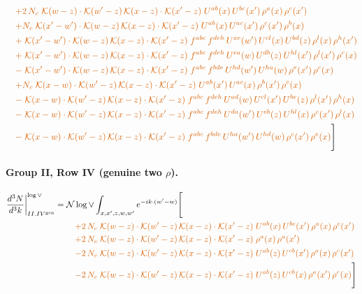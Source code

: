 \documentclass[10pt]{article}
\numberwithin{equation}{section}
\newcommand{\NNv}{\mathcal N\log\vee}
\begin{document}
\begin{align}
&\quad{\color{BFK}+2\,N_c\;\mathcal{K}(w-z)\cdot\mathcal{K}(w'-z)\,\mathcal{K}(x-z)\cdot\mathcal{K}(x'-z)\;U^{ab}(x)\,U^{bc}(x')\,\rho^{a}(x)\,\rho^{c}(x')}\notag\\
&\quad{\color{BFK}+N_c\;\mathcal{K}(x'-w')\cdot\mathcal{K}(w-z)\,\mathcal{K}(x-z)\cdot\mathcal{K}(x'-z)\;U^{ab}(x)\,U^{ac}(x')\,\rho^{c}(x')\,\rho^{b}(x)}\notag\\
&\quad{\color{BFK}+\;\mathcal{K}(x'-w')\cdot\mathcal{K}(w-z)\,\mathcal{K}(x-z)\cdot\mathcal{K}(x'-z)\;f^{abc}\,f^{deh}\,U^{ae}(w')\,U^{cl}(x)\,U^{bd}(z)\,\rho^{l}(x)\,\rho^{h}(x')}\notag\\
&\quad{\color{BFK}+\;\mathcal{K}(x'-w')\cdot\mathcal{K}(w-z)\,\mathcal{K}(x-z)\cdot\mathcal{K}(x'-z)\;f^{abc}\,f^{deh}\,U^{ea}(w)\,U^{db}(z)\,U^{hl}(x')\,\rho^{l}(x')\,\rho^{c}(x)}\notag\\
&\quad{\color{BFK}-\;\mathcal{K}(x'-w')\cdot\mathcal{K}(w-z)\,\mathcal{K}(x-z)\cdot\mathcal{K}(x'-z)\;f^{abc}\,f^{bde}\,U^{hd}(w')\,U^{ha}(w)\,\rho^{e}(x')\,\rho^{c}(x)}\notag\\
&\quad{\color{BFK}+N_c\;\mathcal{K}(x-w)\cdot\mathcal{K}(w'-z)\,\mathcal{K}(x-z)\cdot\mathcal{K}(x'-z)\;U^{ab}(x')\,U^{ac}(x)\,\rho^{b}(x')\,\rho^{c}(x)}\notag\\
&\quad{\color{BFK}-\;\mathcal{K}(x-w)\cdot\mathcal{K}(w'-z)\,\mathcal{K}(x-z)\cdot\mathcal{K}(x'-z)\;f^{abc}\,f^{deh}\,U^{ad}(w)\,U^{cl}(x')\,U^{be}(z)\,\rho^{l}(x')\,\rho^{h}(x)}\notag\\
&\quad{\color{BFK}-\;\mathcal{K}(x-w)\cdot\mathcal{K}(w'-z)\,\mathcal{K}(x-z)\cdot\mathcal{K}(x'-z)\;f^{abc}\,f^{deh}\,U^{da}(w')\,U^{eb}(z)\,U^{hl}(x)\,\rho^{c}(x')\,\rho^{l}(x)}\notag\\
&\quad{\color{BFK}-\;\mathcal{K}(x-w)\cdot\mathcal{K}(w'-z)\,\mathcal{K}(x-z)\cdot\mathcal{K}(x'-z)\;f^{abc}\,f^{bde}\,U^{ha}(w')\,U^{hd}(w)\,\rho^{c}(x')\,\rho^{e}(x)}\Bigg]\label{eq:P9}
\end{align}
\paragraph{Group II, Row IV (genuine two $\rho$).}
\begin{align}
\frac{d^3N}{d^3k}\bigg|^{\log\vee}_{II.IV^{\rm gen}}={}&\NNv\int_{x,x',z,w,w'}e^{-ik\cdot(w'-w)}\Bigg[\notag\\
&\quad{\color{BFK}+2\,N_c\;\mathcal{K}(w-z)\cdot\mathcal{K}(w'-z)\,\mathcal{K}(x-z)\cdot\mathcal{K}(x'-z)\;U^{ab}(x)\,U^{bc}(x')\,\rho^{a}(x)\,\rho^{c}(x')}\notag\\
&\quad{\color{BFK}+2\,N_c\;\mathcal{K}(w-z)\cdot\mathcal{K}(w'-z)\,\mathcal{K}(x-z)\cdot\mathcal{K}(x'-z)\;\rho^{a}(x)\,\rho^{a}(x')}\notag\\
&\quad{\color{BFK}-2\,N_c\;\mathcal{K}(w-z)\cdot\mathcal{K}(w'-z)\,\mathcal{K}(x-z)\cdot\mathcal{K}(x'-z)\;U^{ab}(z)\,U^{cb}(x')\,\rho^{a}(x)\,\rho^{c}(x')}\notag\\
&\quad{\color{BFK}-2\,N_c\;\mathcal{K}(w-z)\cdot\mathcal{K}(w'-z)\,\mathcal{K}(x-z)\cdot\mathcal{K}(x'-z)\;U^{ab}(z)\,U^{cb}(x)\,\rho^{a}(x')\,\rho^{c}(x)}\Bigg]\label{eq:P10}
\end{align}
\end{document}
